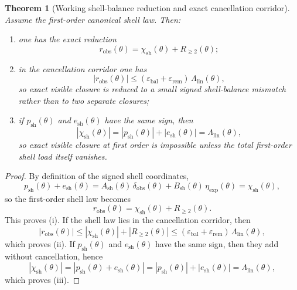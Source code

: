 \documentclass[12pt,a4paper]{article}
\newtheorem{theorem}{Theorem}[section]
\begin{document}
\begin{theorem}[Working shell-balance reduction and exact cancellation corridor]
Assume the first-order canonical shell law. Then:
\begin{enumerate}[leftmargin=2em,label=(\roman*)]
\item one has the exact reduction
\[
 r_{\mathrm{obs}}(\theta)=\chi_{\mathrm{sh}}(\theta)+R_{\ge 2}(\theta);
\]
\item in the cancellation corridor one has
\[
 |r_{\mathrm{obs}}(\theta)|
 \le (\varepsilon_{\mathrm{bal}}+\varepsilon_{\mathrm{rem}})\,\Lambda_{\mathrm{lin}}(\theta),
\]
so exact visible closure is reduced to a small signed shell-balance mismatch rather than to two separate closures;
\item if $p_{\mathrm{sh}}(\theta)$ and $e_{\mathrm{sh}}(\theta)$ have the same sign, then
\[
 |\chi_{\mathrm{sh}}(\theta)|=|p_{\mathrm{sh}}(\theta)|+|e_{\mathrm{sh}}(\theta)|=\Lambda_{\mathrm{lin}}(\theta),
\]
so exact visible closure at first order is impossible unless the total first-order shell load itself vanishes.
\end{enumerate}
\end{theorem}

\begin{proof}
By definition of the signed shell coordinates,
\[
 p_{\mathrm{sh}}(\theta)+e_{\mathrm{sh}}(\theta)=A_{\mathrm{sh}}(\theta)\,\delta_{\mathrm{obs}}(\theta)+B_{\mathrm{sh}}(\theta)\,\eta_{\mathrm{exp}}(\theta)=\chi_{\mathrm{sh}}(\theta),
\]
so the first-order shell law becomes
\[
 r_{\mathrm{obs}}(\theta)=\chi_{\mathrm{sh}}(\theta)+R_{\ge 2}(\theta).
\]
This proves (i). If the shell law lies in the cancellation corridor, then
\[
 |r_{\mathrm{obs}}(\theta)|\le |\chi_{\mathrm{sh}}(\theta)|+|R_{\ge 2}(\theta)|
 \le (\varepsilon_{\mathrm{bal}}+\varepsilon_{\mathrm{rem}})\,\Lambda_{\mathrm{lin}}(\theta),
\]
which proves (ii). If $p_{\mathrm{sh}}(\theta)$ and $e_{\mathrm{sh}}(\theta)$ have the same sign, then they add without cancellation, hence
\[
 |\chi_{\mathrm{sh}}(\theta)|=|p_{\mathrm{sh}}(\theta)+e_{\mathrm{sh}}(\theta)|=|p_{\mathrm{sh}}(\theta)|+|e_{\mathrm{sh}}(\theta)|=\Lambda_{\mathrm{lin}}(\theta),
\]
which proves (iii).
\end{proof}
\end{document}
